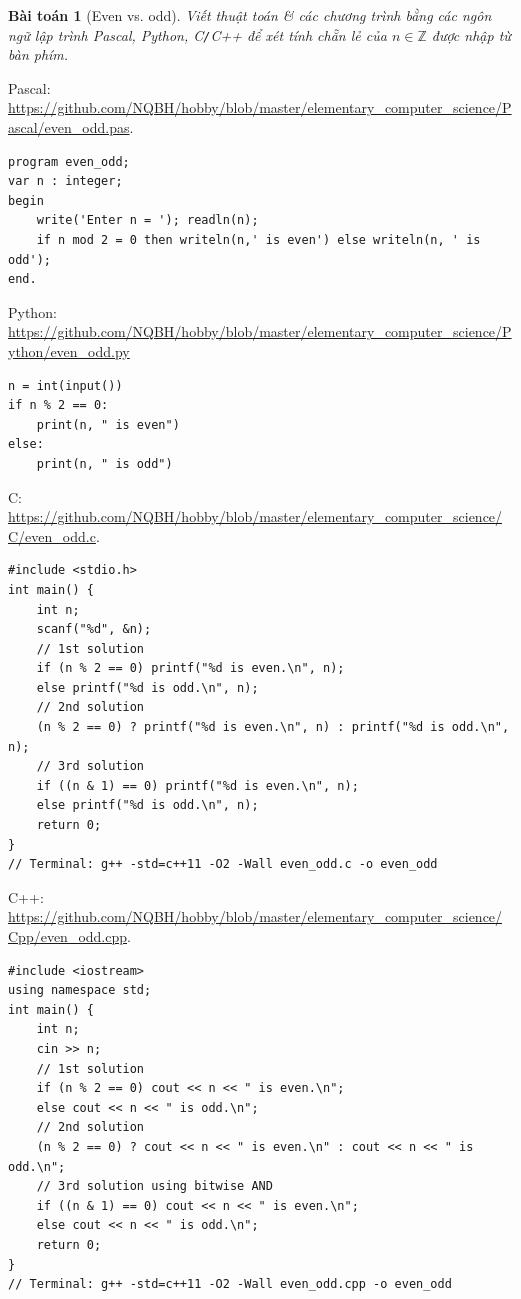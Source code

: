 \documentclass{article}
\newtheorem{baitoan}{Bài toán}
\begin{document}
\begin{baitoan}[Even vs. odd]
	Viết thuật toán \& các chương trình bằng các ngôn ngữ lập trình {\sf Pascal, Python, C\texttt{/}C++} để xét tính chẵn lẻ của $n\in\mathbb{Z}$ được nhập từ bàn phím.
\end{baitoan}
\noindent Pascal: \url{https://github.com/NQBH/hobby/blob/master/elementary_computer_science/Pascal/even_odd.pas}.
\begin{verbatim}
program even_odd;
var n : integer;
begin
    write('Enter n = '); readln(n);
    if n mod 2 = 0 then writeln(n,' is even') else writeln(n, ' is odd');
end.
\end{verbatim}
Python: \url{https://github.com/NQBH/hobby/blob/master/elementary_computer_science/Python/even_odd.py}
\begin{verbatim}
n = int(input())
if n % 2 == 0:
    print(n, " is even")
else:
    print(n, " is odd")
\end{verbatim}
C: \url{https://github.com/NQBH/hobby/blob/master/elementary_computer_science/C/even_odd.c}.
\begin{verbatim}
#include <stdio.h>
int main() {
    int n;
    scanf("%d", &n);
    // 1st solution
    if (n % 2 == 0) printf("%d is even.\n", n);
    else printf("%d is odd.\n", n);
    // 2nd solution
    (n % 2 == 0) ? printf("%d is even.\n", n) : printf("%d is odd.\n", n);
    // 3rd solution
    if ((n & 1) == 0) printf("%d is even.\n", n);
    else printf("%d is odd.\n", n);
    return 0;
}
// Terminal: g++ -std=c++11 -O2 -Wall even_odd.c -o even_odd
\end{verbatim}
C++: \url{https://github.com/NQBH/hobby/blob/master/elementary_computer_science/Cpp/even_odd.cpp}.
\begin{verbatim}
#include <iostream>
using namespace std;
int main() {
    int n;
    cin >> n;
    // 1st solution
    if (n % 2 == 0) cout << n << " is even.\n";
    else cout << n << " is odd.\n";
    // 2nd solution
    (n % 2 == 0) ? cout << n << " is even.\n" : cout << n << " is odd.\n";
    // 3rd solution using bitwise AND
    if ((n & 1) == 0) cout << n << " is even.\n";
    else cout << n << " is odd.\n";
    return 0;
}
// Terminal: g++ -std=c++11 -O2 -Wall even_odd.cpp -o even_odd
\end{verbatim}
\end{document}
